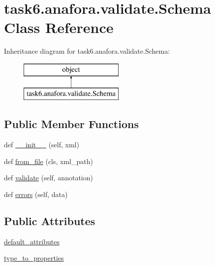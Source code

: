 \hypertarget{classtask6_1_1anafora_1_1validate_1_1Schema}{}\section{task6.\+anafora.\+validate.\+Schema Class Reference}
\label{classtask6_1_1anafora_1_1validate_1_1Schema}
Inheritance diagram for task6.\+anafora.\+validate.\+Schema\+:\begin{figure}[H]
\begin{center}
\leavevmode
\includegraphics[height=2.000000cm]{classtask6_1_1anafora_1_1validate_1_1Schema}
\end{center}
\end{figure}
\subsection*{Public Member Functions}
\begin{DoxyCompactItemize}
\item 
def \hyperlink{classtask6_1_1anafora_1_1validate_1_1Schema_a6e0c62fbe64dd977f7f5b8c4f74a7135}{\+\_\+\+\_\+init\+\_\+\+\_\+} (self, xml)
\item 
def \hyperlink{classtask6_1_1anafora_1_1validate_1_1Schema_aa9de826802e78359a447f72202a9928a}{from\+\_\+file} (cls, xml\+\_\+path)
\item 
def \hyperlink{classtask6_1_1anafora_1_1validate_1_1Schema_a26a7af84dc2a7e4f221c7197d3262e5d}{validate} (self, annotation)
\item 
def \hyperlink{classtask6_1_1anafora_1_1validate_1_1Schema_a8730129d19e902b54bfa5e6307ce34af}{errors} (self, data)
\end{DoxyCompactItemize}
\subsection*{Public Attributes}
\begin{DoxyCompactItemize}
\item 
\hyperlink{classtask6_1_1anafora_1_1validate_1_1Schema_aadd81185c55a9b47cff2511034cd0bd1}{default\+\_\+attributes}
\item 
\hyperlink{classtask6_1_1anafora_1_1validate_1_1Schema_a23290d2792456b0cf5b3a2b593bde8ec}{type\+\_\+to\+\_\+properties}
\end{DoxyCompactItemize}


